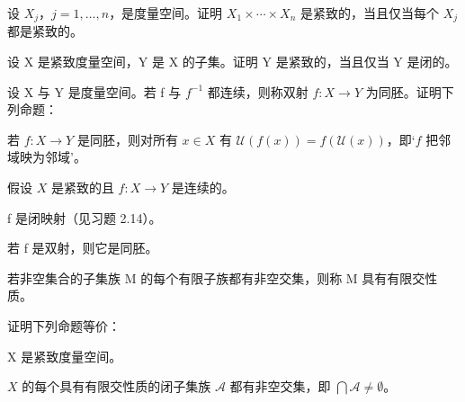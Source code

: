 \begin{exercises}
\item

设 $ X_j $，$ j = 1, \ldots, n $，是度量空间。证明 $ X_1 \times \cdots \times X_n $ 是紧致的，当且仅当每个 $ X_j $ 都是紧致的。

\item

设 X 是紧致度量空间，Y 是 X 的子集。证明 Y 是紧致的，当且仅当 Y 是闭的。

\item

设 X 与 Y 是度量空间。若 f 与 $ f^{-1} $ 都连续，则称双射 $ f: X \to Y $ 为同胚。证明下列命题：

\begin{items}
\item

若 $f: X \to Y$ 是同胚，则对所有 $x \in X$ 有 $\mathcal{U}(f(x)) = f(\mathcal{U}(x))$，即‘$f$ 把邻域映为邻域’。

\item

假设 $X$ 是紧致的且 $f: X \to Y$ 是连续的。

\end{items}

\begin{subitems}
\item

f 是闭映射（见习题 2.14）。

\item

若 f 是双射，则它是同胚。

\end{subitems}

\item

若非空集合的子集族 M 的每个有限子族都有非空交集，则称 M 具有有限交性质。

证明下列命题等价：

\begin{items}
\item

X 是紧致度量空间。

\item

$ X $ 的每个具有有限交性质的闭子集族 $ \mathcal{A} $ 都有非空交集，即 $ \bigcap \mathcal{A} \neq \emptyset $。

\end{items}

\item


\end{exercises}
